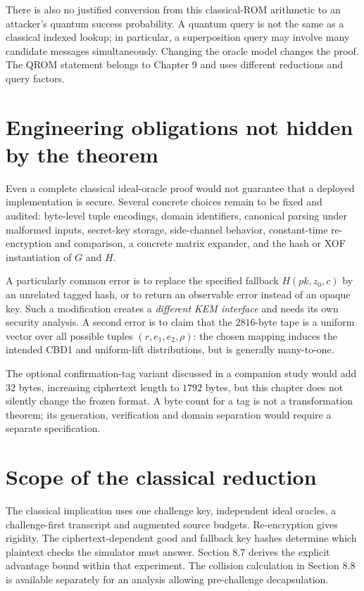 \documentclass[
  11pt,
  a4paper,
  oneside]{report}
\begin{document}
There is also no justified conversion from this classical-ROM arithmetic
to an attacker's quantum success probability. A quantum query is not the
same as a classical indexed lookup; in particular, a superposition query
may involve many candidate messages simultaneously. Changing the oracle
model changes the proof. The QROM statement belongs to Chapter 9 and
uses different reductions and query factors.

\section{Engineering obligations not hidden by the
theorem}\label{engineering-obligations-not-hidden-by-the-theorem}

Even a complete classical ideal-oracle proof would not guarantee that a
deployed implementation is secure. Several concrete choices remain to be
fixed and audited: byte-level tuple encodings, domain identifiers,
canonical parsing under malformed inputs, secret-key storage,
side-channel behavior, constant-time re-encryption and comparison, a
concrete matrix expander, and the hash or XOF instantiation of \(G\) and
\(H\).

A particularly common error is to replace the specified fallback
\(H(pk,z_0,c)\) by an unrelated tagged hash, or to return an observable
error instead of an opaque key. Such a modification creates a
\emph{different KEM interface} and needs its own security analysis. A
second error is to claim that the \(2816\)-byte tape is a uniform vector
over all possible tuples \((r,e_1,e_2,\rho)\): the chosen mapping
induces the intended CBD1 and uniform-lift distributions, but is
generally many-to-one.

The optional confirmation-tag variant discussed in a companion study
would add \(32\) bytes, increasing ciphertext length to \(1792\) bytes,
but this chapter does not silently change the frozen format. A byte
count for a tag is not a transformation theorem; its generation,
verification and domain separation would require a separate
specification.

\section{Scope of the classical
reduction}\label{scope-of-the-classical-reduction}

The classical implication uses one challenge key, independent ideal
oracles, a challenge-first transcript and augmented source budgets.
Re-encryption gives rigidity. The ciphertext-dependent good and fallback
key hashes determine which plaintext checks the simulator must answer.
Section 8.7 derives the explicit advantage bound within that experiment.
The collision calculation in Section 8.8 is available separately for an
analysis allowing pre-challenge decapsulation.
\end{document}
